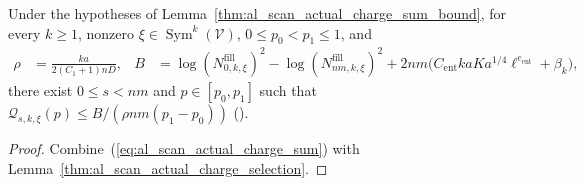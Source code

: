 \begin{lemma}
    \label{thm:al_scan_actual_charge_sum_selection}
    \leanok
    Under the hypotheses of Lemma~\ref{thm:al_scan_actual_charge_sum_bound},
    for every $k\ge1$, nonzero $\xi\in\operatorname{Sym}^k(\mathcal V)$,
    $0\le p_0<p_1\le1$, and
    \begin{align}
        \rho & = \frac{ka}{2(C_1+1)nD},               &
        B    & = \log (N^{\mathrm{fill}}_{0,k,\xi})^2
        -\log (N^{\mathrm{fill}}_{nm,k,\xi})^2
        +2nm\bigl(C_{\mathrm{ent}}kaKa^{1/4}\ell^{e_{\mathrm{ent}}}+\beta_k\bigr),
        \label{eq:al_scan_actual_charge_sum_selection_defs}
    \end{align}
    there exist $0\le s<nm$ and $p\in[p_0,p_1]$ such that
    $\mathcal Q_{s,k,\xi}(p)\le B/(\rho nm(p_1-p_0))$
    (\cite[Section~9]{OpenAI2026AreaLaw}).
\end{lemma}
\begin{proof}\leanok
    Combine~(\ref{eq:al_scan_actual_charge_sum}) with
    Lemma~\ref{thm:al_scan_actual_charge_selection}.
\end{proof}
